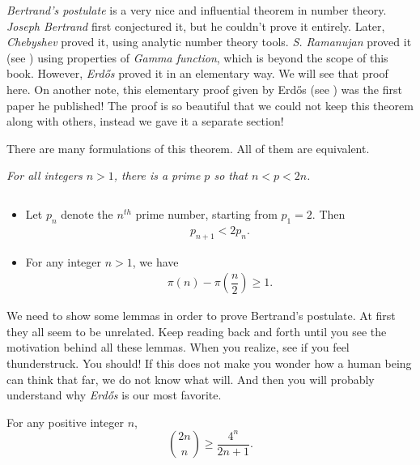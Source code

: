 \documentclass{subfile}
\begin{document}
	\label{sec:bertrandspostulate}
	\textit{Bertrand's postulate} is a very nice and influential theorem in number theory. \textit{Joseph Bertrand} first conjectured it, but he couldn't prove it entirely. Later, \textit{Chebyshev} proved it, using analytic number theory tools. \textit{S. Ramanujan} proved it (see \cite{ramanujan}) using properties of \textit{Gamma function}, which is beyond the scope of this book. However, \textit{Erd\H{o}s} proved it in an elementary way. We will see that proof here. On another note, this elementary proof given by Erd\H{o}s (see \cite{erdos}) was the first paper he published! The proof is so beautiful that we could not keep this theorem along with others, instead we gave it a separate section!
	
	There are many formulations of this theorem. All of them are equivalent.
	
	\begin{theorem}\slshape
		For all integers $n>1$, there is a prime $p$ so that $n<p<2n$.\label{thm:bertrand}
	\end{theorem}
	
	\begin{theorem}\slshape\label{thm:bertrandalternative}
		$ $
		\begin{itemize}
			\item Let $p_n$ denote the $n^{th}$ prime number, starting from $p_1=2$. Then
			\begin{eqnarray*}
				p_{n+1} <2p_n.
			\end{eqnarray*}
			\item For any integer $n >1$, we have
			\begin{eqnarray*}
				\pi(n)-\pi\left(\dfrac{n}{2}\right)\geq1.
			\end{eqnarray*}
		\end{itemize}
	\end{theorem}
	
	We need to show some lemmas in order to prove Bertrand's postulate. At first they all seem to be unrelated. Keep reading back and forth until you see the motivation behind all these lemmas. When you realize, see if you feel thunderstruck. You should! If this does not make you wonder how a human being can think that far, we do not know what will. And then you will probably understand why \textit{Erd\H {o}s} is our most favorite.
	
	\begin{lemma}\label{lem:bertrand1}
		For any positive integer $n$,
		\[\binom{2n}{n}\geq\dfrac{4^n}{2n+1}.\]
	\end{lemma}
	
\end{document}
